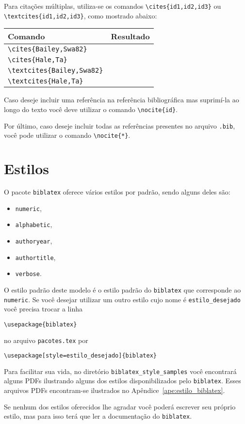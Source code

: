 Para citações múltiplas, utiliza-se os comandos \lstinline+\cites{id1,id2,id3}+
ou \lstinline+\textcites{id1,id2,id3}+, como mostrado abaixo:
\begin{table}[!h]
  \centering
  \begin{tabular}{lc}
    \toprule
    Comando & Resultado \\ \midrule
    \lstinline+\cites{Bailey,Swa82}+ & \cites{Bailey,Swa82} \\
    \lstinline+\cites{Hale,Ta}+ & \cites{Hale,Ta} \\
    \lstinline+\textcites{Bailey,Swa82}+ & \textcites{Bailey,Swa82} \\
    \lstinline+\textcites{Hale,Ta}+ & \textcites{Hale,Ta} \\ \bottomrule
  \end{tabular}
\end{table}

Caso deseje incluir uma referência na referência bibliográfica mas
suprimí-la ao longo do texto você deve utilizar o comando
\lstinline+\nocite{id}+.

Por último, caso deseje incluir todas as referências presentes no arquivo
\lstinline+.bib+, você pode utilizar o comando \lstinline+\nocite{*}+.\nocite{*}

\section{Estilos}
O pacote \lstinline+biblatex+ oferece vários estilos por padrão, sendo alguns
deles são:
\begin{itemize}
  \item \lstinline+numeric+,
  \item \lstinline+alphabetic+,
  \item \lstinline+authoryear+,
  \item \lstinline+authortitle+,
  \item \lstinline+verbose+.
\end{itemize}

O estilo padrão deste modelo é o estilo padrão do \lstinline+biblatex+ que
corresponde ao \lstinline+numeric+. Se você desejar utilizar um outro estilo
cujo nome é \lstinline+estilo_desejado+ você precisa trocar a linha
\begin{lstlisting}
\usepackage{biblatex}
\end{lstlisting}
no arquivo \lstinline+pacotes.tex+ por
\begin{lstlisting}
\usepackage[style=estilo_desejado]{biblatex}
\end{lstlisting}

Para facilitar sua vida, no diretório \lstinline+biblatex_style_samples+ você
encontrará alguns PDFs ilustrando alguns dos estilos disponibilizados pelo
\lstinline+biblatex+. Esses arquivos PDFs encontram-se ilustrados no
Apêndice~\ref{ape:estilo_biblatex}.

Se nenhum dos estilos oferecidos lhe agradar você poderá escrever seu próprio
estilo, mas para isso terá que ler a documentação do \lstinline+biblatex+.

